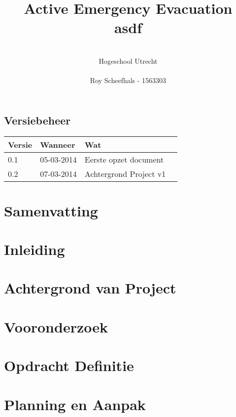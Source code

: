 \documentclass{../local}
\title{\textbf{Active Emergency Evacuation}\\asdf}
\author{\\
		Hogeschool Utrecht\\
		\\
		Roy Scheefhals - 1563303}
\begin{document}
 
\maketitle
\newpage\null\thispagestyle{empty}

\renewcommand{\thesection}{\Roman{section}}

\section*{Versiebeheer}
\begin{tabular}{ | l | l | l | p{7.5cm} |}
\hline
Versie & Wanneer & Wat \\ \hline
0.1 & 05-03-2014 & Eerste opzet document\\ \hline
0.2 & 07-03-2014 & Achtergrond Project v1\\ \hline

\end{tabular}
\clearpage

\chapter{Samenvatting}

\clearpage

\chapter{Inleiding}

\clearpage

\newpage\null\thispagestyle{empty}

\renewcommand{\thesection}{\arabic{section}}

\thispagestyle{empty}
\setcounter{page}{0}
\tableofcontents
\clearpage

\chapter{Achtergrond van Project} 


\chapter{Vooronderzoek}


\chapter{Opdracht Definitie}


\chapter{Planning en Aanpak}


%
%


%
\end{document}
